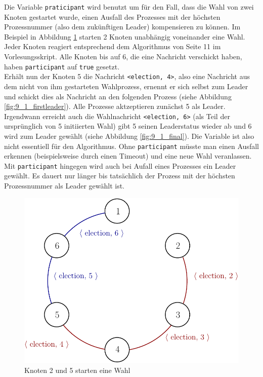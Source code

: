 Die Variable \verb+praticipant+ wird benutzt um für den Fall, dass die Wahl
von zwei Knoten gestartet wurde, einen Ausfall des Prozesses mit der höchsten
Prozessnummer (also dem zukünftigen Leader) kompensieren zu können.
Im Beispiel in Abbildung \ref{fig:9_1_start} starten 2 Knoten unabhängig voneinander
eine Wahl. Jeder Knoten reagiert entsprechend dem Algorithmus von Seite 11 im
Vorlesungsskript. Alle Knoten bis auf 6, die eine Nachricht verschickt haben,
haben \verb+participant+ auf \verb+true+ gesetzt. \\
Erhält nun der Knoten 5 die Nachricht \verb+<election, 4>+, also eine
Nachricht aus dem nicht von ihm gestarteten Wahlprozess, ernennt er sich selbst
zum Leader und schickt dies als Nachricht an den folgenden Prozess (siehe
Abbildung \ref{fig:9_1_firstleader}). Alle Prozesse aktzeptieren zunächst 5 als
Leader. \\
Irgendwann erreicht auch die Wahlnachricht \verb+<election, 6>+ (als Teil
der ursprünglich von 5 initiierten Wahl) gibt 5 seinen Leaderstatus wieder ab
und 6 wird zum Leader gewählt (siehe Abbildung \ref{fig:9_1_final}).
Die Variable ist also nicht essentiell für den Algorithmus. Ohne
\verb+participant+ müsste man einen Ausfall erkennen (beispielsweise durch
einen Timeout) und eine neue Wahl veranlassen. \\
Mit \verb+participant+ hingegen wird auch bei Aufall eines Prozesses ein Leader gewählt. Es dauert nur
länger bis tatsächlich der Prozess mit der höchsten Prozessnummer als Leader
gewählt ist.
\begin{figure}
  \begin{center}
    \includegraphics{pics/9_1_1.pdf}
  \end{center}
  \caption{Knoten 2 und 5 starten eine Wahl}
  \label{fig:9_1_start}
\end{figure}

